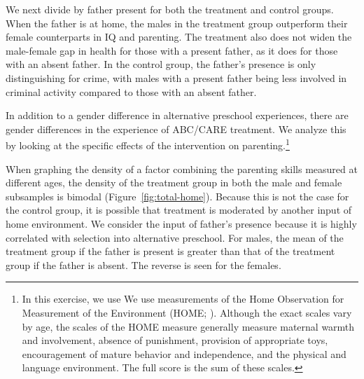 We next divide by father present for both the treatment and control groups. When the father is at home, the males in the treatment group outperform their female counterparts in IQ and parenting. The treatment also does not widen the male-female gap in health for those with a present father, as it does for those with an absent father. In the control group, the father's presence is only distinguishing for crime, with males with a present father being less involved in criminal activity compared to those with an absent father.

In addition to a gender difference in alternative preschool experiences, there are gender differences in the experience of ABC/CARE treatment. We analyze this by looking at the specific effects of the intervention on parenting.\footnote{In this exercise, we use We use measurements of the Home Observation for Measurement of the Environment (HOME; \citet{Bradley-Caldwell_1977_AJMD}). Although the exact scales vary by age, the scales of the HOME measure generally measure maternal warmth and involvement, absence of punishment, provision of appropriate toys, encouragement of mature behavior and independence, and the physical and language environment. The full score is the sum of these scales.}

When graphing the density of a factor combining the parenting skills measured at different ages, the density of the treatment group in both the male and female subsamples is bimodal (Figure~\ref{fig:total-home}). Because this is not the case for the control group, it is possible that treatment is moderated by another input of home environment. We consider the input of father's presence because it is highly correlated with selection into alternative preschool. For males, the mean of the treatment group if the father is present is greater than that of the treatment group if the father is absent. The reverse is seen for the females.

